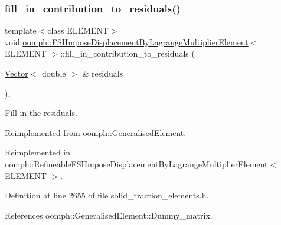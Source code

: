 \subsubsection{\texorpdfstring{fill\+\_\+in\+\_\+contribution\+\_\+to\+\_\+residuals()}{fill\_in\_contribution\_to\_residuals()}}
{\footnotesize\ttfamily template$<$class E\+L\+E\+M\+E\+NT$>$ \\
void \hyperlink{classoomph_1_1FSIImposeDisplacementByLagrangeMultiplierElement}{oomph\+::\+F\+S\+I\+Impose\+Displacement\+By\+Lagrange\+Multiplier\+Element}$<$ E\+L\+E\+M\+E\+NT $>$\+::fill\+\_\+in\+\_\+contribution\+\_\+to\+\_\+residuals (\begin{DoxyParamCaption}\item[{\hyperlink{classoomph_1_1Vector}{Vector}$<$ double $>$ \&}]{residuals }\end{DoxyParamCaption})\hspace{0.3cm}{\ttfamily [inline]}, {\ttfamily [virtual]}}



Fill in the residuals. 



Reimplemented from \hyperlink{classoomph_1_1GeneralisedElement_a310c97f515e8504a48179c0e72c550d7}{oomph\+::\+Generalised\+Element}.



Reimplemented in \hyperlink{classoomph_1_1RefineableFSIImposeDisplacementByLagrangeMultiplierElement_aa4b78afa54ddb638bfc9428b2b6fe860}{oomph\+::\+Refineable\+F\+S\+I\+Impose\+Displacement\+By\+Lagrange\+Multiplier\+Element$<$ E\+L\+E\+M\+E\+N\+T $>$}.



Definition at line 2655 of file solid\+\_\+traction\+\_\+elements.\+h.



References oomph\+::\+Generalised\+Element\+::\+Dummy\+\_\+matrix.

\mbox{\label{classoomph_1_1FSIImposeDisplacementByLagrangeMultiplierElement_abf26cdce6da0f50ff1169d79d4319c4a}} 
